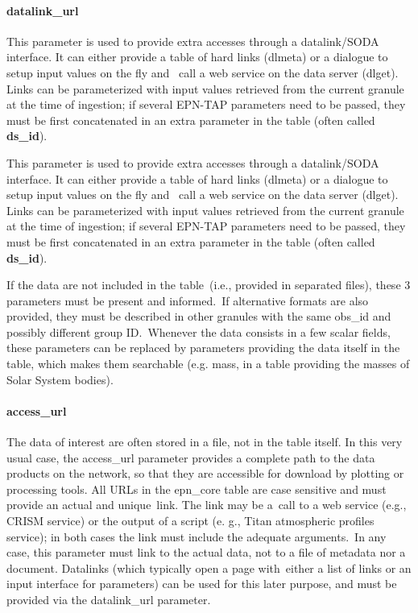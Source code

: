 \documentclass[11pt,a4paper]{ivoa}
\begin{document}
\paragraph{datalink\_url}

This parameter is used to provide extra accesses through a datalink/SODA interface. It can either provide a table of hard links (dlmeta) or a dialogue to setup input values on the fly and  call a web service on the data server (dlget). Links can be parameterized with input values retrieved from the current granule at the time of ingestion; if several EPN-TAP parameters need to be passed, they must be first concatenated in an extra parameter in the table (often called \textbf{ds\_id}).

This parameter is used to provide extra accesses through a datalink/SODA interface. It can either provide a table of hard links (dlmeta) or a dialogue to setup input values on the fly and  call a web service on the data server (dlget). Links can be parameterized with input values retrieved from the current granule at the time of ingestion; if several EPN-TAP parameters need to be passed, they must be first concatenated in an extra parameter in the table (often called \textbf{ds\_id}).

If the data are not included in the table (i.e., provided in separated files), these 3 parameters must be present and informed. If alternative formats are also provided, they must be described in other granules with the same obs\_id and possibly different group ID. Whenever the data consists in a few scalar fields, these parameters can be replaced by parameters providing the data itself in the table, which makes them searchable (e.g. mass, in a table providing the masses of Solar System bodies).

\paragraph{access\_url}

The data of interest are often stored in a file, not in the table itself. In this very usual case, the access\_url parameter provides a complete path to the data products on the network, so that they are accessible for download by plotting or processing tools. All URLs in the epn\_core table are case sensitive and must provide an actual and unique link. The link may be a call to a web service (e.g., CRISM service) or the output of a script (e. g., Titan atmospheric profiles service); in both cases the link must include the adequate arguments. In any case, this parameter must link to the actual data, not to a file of metadata nor a document. Datalinks (which typically open a page with either a list of links or an input interface for parameters) can be used for this later purpose, and must be provided via the datalink\_url parameter. 
\end{document}
